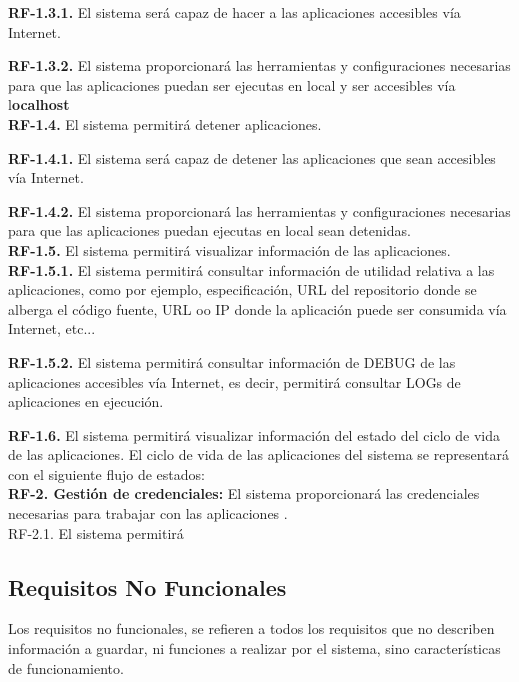 \documentclass[a4paper,11pt]{book}
\begin{document}
	\quad \textbf{RF-1.3.1.} El sistema será capaz de hacer a las aplicaciones accesibles vía Internet.  
	
	\quad \textbf{RF-1.3.2.} El sistema proporcionará las herramientas  y configuraciones necesarias para que las aplicaciones puedan ser ejecutas en local y ser accesibles vía l\textbf{ocalhost}  \\
	

	\textbf{RF-1.4.} El sistema permitirá detener aplicaciones.
	
		\quad \textbf{RF-1.4.1.} El sistema será capaz de detener las aplicaciones que sean accesibles vía Internet. 
		
			\quad \textbf{RF-1.4.2.} El sistema proporcionará las herramientas  y configuraciones necesarias para que las aplicaciones puedan ejecutas en local sean detenidas. \\
			
	
	\textbf{RF-1.5.} El sistema permitirá visualizar información de las aplicaciones.\\
	
		\quad \textbf{RF-1.5.1.} El sistema permitirá consultar  información de utilidad relativa a las aplicaciones,  como por ejemplo, especificación, URL del repositorio donde se alberga el código fuente, URL oo IP donde la aplicación puede ser consumida vía Internet, etc...
	
			\quad \textbf{RF-1.5.2.} El sistema permitirá consultar información de DEBUG de las aplicaciones accesibles vía Internet, es decir, permitirá consultar LOGs de aplicaciones en ejecución. 
			
	\textbf{RF-1.6.} El sistema permitirá visualizar información del estado del ciclo de vida de las aplicaciones. El ciclo de vida de las aplicaciones del sistema se representará con el siguiente flujo de estados:\\
			
\textbf{RF-2. Gestión de credenciales:} El sistema proporcionará las credenciales necesarias para trabajar con las aplicaciones .\\
   

	RF-2.1. El sistema permitirá 


\subsection{Requisitos No Funcionales }
Los requisitos no funcionales, se refieren a todos los requisitos que no describen información a guardar, ni funciones a realizar por el sistema, sino características de funcionamiento.\\
\end{document}
